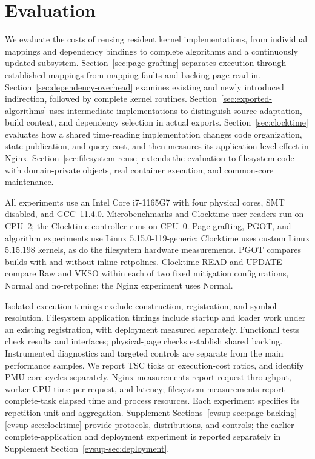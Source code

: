 \section{Evaluation}
\label{sec:evaluation}

We evaluate the costs of reusing resident kernel implementations, from
individual mappings and dependency bindings to complete algorithms and
a continuously updated subsystem. Section~\ref{sec:page-grafting}
separates execution through established mappings from mapping faults
and backing-page read-in. Section~\ref{sec:dependency-overhead} examines
existing and newly introduced indirection, followed by complete kernel
routines. Section~\ref{sec:exported-algorithms} uses intermediate
implementations to distinguish source adaptation, build context, and
dependency selection in actual exports.
Section~\ref{sec:clocktime} evaluates how a shared time-reading
implementation changes code organization, state publication, and query
cost, and then measures its application-level effect in Nginx.
Section~\ref{sec:filesystem-reuse} extends the evaluation to filesystem
code with domain-private objects, real container execution, and common-core
maintenance.

All experiments use an Intel Core i7-1165G7 with four physical cores,
SMT disabled, and GCC~11.4.0. Microbenchmarks and Clocktime user readers
run on CPU~2; the Clocktime controller runs on CPU~0. Page-grafting,
PGOT, and algorithm experiments use Linux 5.15.0-119-generic; Clocktime
uses custom Linux 5.15.198 kernels, as do the filesystem hardware measurements.
PGOT compares builds with and without
inline retpolines. Clocktime READ and UPDATE compare Raw and VKSO within
each of two fixed mitigation configurations, Normal and no-retpoline;
the Nginx experiment uses Normal.

Isolated execution timings exclude construction, registration, and symbol
resolution. Filesystem application timings include startup and loader work
under an existing registration, with deployment measured separately.
Functional tests check results and interfaces; physical-page
checks establish shared backing. Instrumented diagnostics and targeted
controls are separate from the main performance samples. We report TSC
ticks or execution-cost ratios, and identify PMU core cycles separately.
Nginx measurements report request throughput, worker CPU time per
request, and latency; filesystem measurements report complete-task elapsed
time and process resources.
Each experiment specifies its repetition unit and aggregation. Supplement
Sections~\ref{evsup-sec:page-backing}--\ref{evsup-sec:clocktime} provide
protocols, distributions, and controls; the earlier complete-application
and deployment experiment is reported separately in Supplement
Section~\ref{evsup-sec:deployment}.

